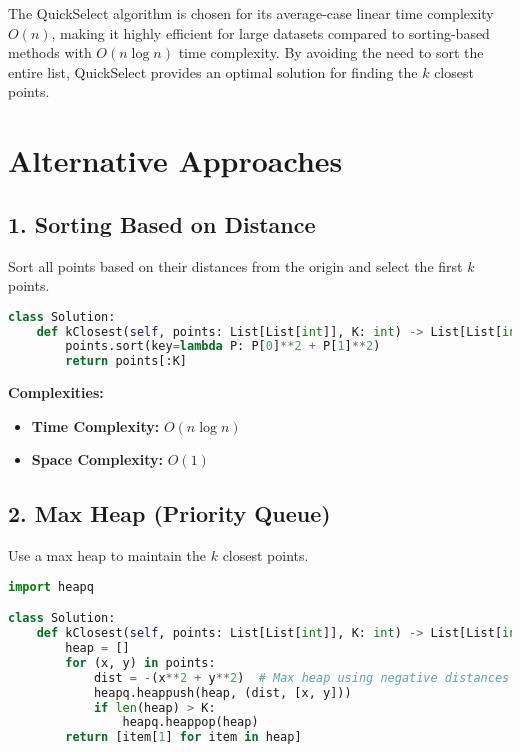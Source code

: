 The QuickSelect algorithm is chosen for its average-case linear time complexity \(O(n)\), making it highly efficient for large datasets compared to sorting-based methods with \(O(n \log n)\) time complexity. By avoiding the need to sort the entire list, QuickSelect provides an optimal solution for finding the \(k\) closest points.

\section*{Alternative Approaches}

\subsection*{1. Sorting Based on Distance}

Sort all points based on their distances from the origin and select the first \(k\) points.

\begin{lstlisting}[language=Python]
class Solution:
    def kClosest(self, points: List[List[int]], K: int) -> List[List[int]]:
        points.sort(key=lambda P: P[0]**2 + P[1]**2)
        return points[:K]
\end{lstlisting}

\textbf{Complexities:}
\begin{itemize}
    \item \textbf{Time Complexity:} \(O(n \log n)\)
    \item \textbf{Space Complexity:} \(O(1)\)
\end{itemize}

\subsection*{2. Max Heap (Priority Queue)}

Use a max heap to maintain the \(k\) closest points.

\begin{lstlisting}[language=Python]
import heapq

class Solution:
    def kClosest(self, points: List[List[int]], K: int) -> List[List[int]]:
        heap = []
        for (x, y) in points:
            dist = -(x**2 + y**2)  # Max heap using negative distances
            heapq.heappush(heap, (dist, [x, y]))
            if len(heap) > K:
                heapq.heappop(heap)
        return [item[1] for item in heap]
\end{lstlisting}

